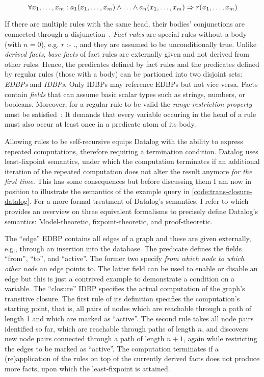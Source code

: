 \begin{equation}
	\forall x_1, \ldots, x_m: a_1(x_1, \ldots, x_m) \land \ldots \land a_n(x_1, \ldots, x_m) \Rightarrow r(x_1, \ldots, x_m) \\
\end{equation}

If there are multiple rules with the same head, their bodies' conjunctions
are connected through a disjunction~\cite{abo2024convergence}.
\emph{Fact rules} are special rules without a body (with $n=0$), e.g.
\( r \text{ :- } .\), and they are assumed to be unconditionally true.
Unlike \emph{derived facts}, \emph{base facts} of fact rules are externally
given and not derived from other rules.
Hence, the predicates defined by fact rules and the predicates defined by regular
rules (those with a body) can be partioned into two disjoint sets:
\emph{\acfp{EDBP}} and \emph{\acfp{IDBP}}. Only \acp{IDBP} may reference \acp{EDBP}
but not vice-versa.
Facts contain \emph{fields} that can assume basic scalar types such as strings,
numbers, or booleans.
Moreover, for a regular rule to be valid the \emph{range-restriction property}
must be satisfied~\cite{green2013datalog}:
It demands that every variable occuring in the head of a rule must also occur
at least once in a predicate atom of its body.

Allowing rules to be self-recursive equips Datalog with the ability to express
repeated computations, therefore requiring a termination condition.
Datalog uses least-fixpoint semantics, under which the computation terminates
if an additional iteration of the repeated computation does not alter the result
anymore \emph{for the first time}.
This has some consequences but before discussing them I am now in position
to illustrate the semantics of the example query in \ref{code:trans-closure-datalog}.
For a more formal treatment of Datalog's semantics, I refer to \cite{green2013datalog}
which provides an overview on three equivalent formalisms to precisely define
Datalog's semantics: Model-theoretic, fixpoint-theoretic, and proof-theoretic.

The ``edge'' \ac{EDBP} contains all edges of a graph and these are given
externally, e.g., through an insertion into the database.
The predicate defines the fields ``from'', ``to'', and ``active''.
The former two specify \emph{from which node to which other node} an edge points to.
The latter field can be used to enable or disable an edge but this is just
a contrived example to demonstrate a condition on a variable.
The ``closure'' \ac{IDBP} specifies the actual computation of the graph's
transitive closure.
The first rule of its definition specifies the computation's starting point,
that is, all pairs of nodes which are reachable through a path of length 1
and which are marked as ``active''.
The second rule takes all node pairs identified so far, which are reachable
through paths of length \(n\), and discovers new node pairs connected
through a path of length \(n + 1\),
again while restricting the edges to be marked as ``active''.
The computation terminates if a (re)application of the rules on top of the
currently derived facts does not produce more facts,
upon which the least-fixpoint is attained.

